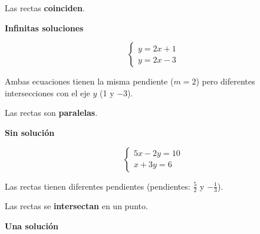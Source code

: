 \begin{exercise}
\begin{solucion}
Las rectas \textbf{coinciden}.

\textbf{Infinitas soluciones}
\end{solucion}

\problem $$\begin{cases}y = 2x + 1 \\ y = 2x - 3\end{cases}$$

\begin{solucion}
Ambas ecuaciones tienen la misma pendiente ($m = 2$) pero diferentes intersecciones con el eje $y$ (1 y $-3$).

Las rectas son \textbf{paralelas}.

\textbf{Sin solución}
\end{solucion}

\problem $$\begin{cases}5x - 2y = 10 \\ x + 3y = 6\end{cases}$$

\begin{solucion}
Las rectas tienen diferentes pendientes (pendientes: $\frac{5}{2}$ y $-\frac{1}{3}$).

Las rectas se \textbf{intersectan} en un punto.

\textbf{Una solución}
\end{solucion}
\end{exercise}

